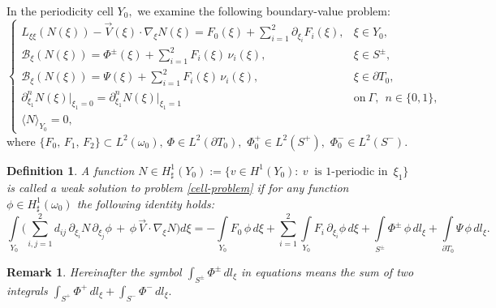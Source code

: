 \documentclass[reqno]{amsart}            %
\newtheorem{definition}{Definition}[section]
\newtheorem{remark}{Remark}[section]
\numberwithin{equation}{section}
\begin{document}
	In the periodicity cell $Y_0,$ we examine the following boundary-value problem:
	\begin{equation}\label{cell-problem}
		\left\{
		\begin{array}{ll}
			L_{\xi\xi}(N(\xi))  - \overrightarrow{V}(\xi) \cdot \nabla_{\xi}N(\xi) = F_0(\xi) + \sum_{i=1}^{2}\partial_{\xi_i} F_i(\xi), &
			\xi\in Y_0,
			\\[3pt]
			\mathcal{B}_{\xi}(N(\xi)) =  \Phi^\pm(\xi) + \sum_{i=1}^{2} F_i(\xi)\, \nu_i(\xi),
			&  \xi \in S^{\pm},
			\\[3pt]
			\mathcal{B}_{\xi}(N(\xi)) =  \Psi(\xi) + \sum_{i=1}^{2} F_i(\xi)\, \nu_i(\xi),
			&  \xi\in \partial T_0,
			\\[3pt]
			\partial^n_{\xi_1}N(\xi)\big|_{\xi_1=0} = \partial^n_{\xi_1}N(\xi)\big|_{\xi_1=1} & \text{on} \ \Gamma, \ \ n\in\{0, 1\},
			\\[3pt]
			\langle N\rangle_{Y_0}= 0, & 
		\end{array}
		\right.
	\end{equation}
	where
	$  \{F_0,\,  F_1,\,  F_2 \} \subset L^2(\omega_0), \ \Phi \in L^2(\partial T_0),$
	$ \Phi^{+}_0 \in L^2(S^{+}),$ $ \Phi^{-}_0 \in L^2(S^{-}).$
	
	\begin{definition}
		A function $N\in H^1_\sharp(Y_0):=\{v\in H^1(Y_0)\colon \   v \ \text{ is 1-periodic in } \, \xi_1 \}$ is called a weak solution to problem \eqref{cell-problem} if for any function $\phi \in H^1_\sharp(\omega_0)$ the following identity holds:
		\begin{equation*}
			\int\limits_{Y_0}\Big(\sum_{i, j=1}^{2} d_{ij}\, \partial_{\xi_i}N \, \partial_{\xi_j}\phi \, + \,   \phi \, \overrightarrow{V}\cdot\nabla_{\xi}N\Big) d\xi =
			-\int\limits_{Y_0} F_0\, \phi \, d\xi + \sum_{i=1}^{2} \int\limits_{Y_0} F_i \, \partial_{\xi_i}\phi \, d\xi + \int\limits_{S^{\pm}} \Phi^{\pm} \, \phi \, dl_{\xi} +  \int\limits_{\partial T_0} \Psi \, \phi \, dl_{\xi}.
		\end{equation*}
	\end{definition}
	\begin{remark}
		Hereinafter the symbol  $\int_{S^{\pm}} \Phi^{\pm}\, dl_{\xi}$ in equations means the sum of two integrals
		$\int_{S^{+}} \Phi^{+}\, dl_{\xi} + \int_{S^{-}} \Phi^{-}\, dl_{\xi}.$
	\end{remark}
	
\end{document}

